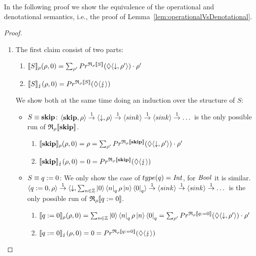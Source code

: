 \documentclass[a4paper,UKenglish,cleveref, autoref, thm-restate]{lipics-v2021}
\begin{document}
In the following proof we show the equivalence of the operational and denotational semantics, i.e., the proof of Lemma~\ref{lem:operationalVsDenotational}.
\begin{proof}
    \begin{enumerate}
        \item The first claim consist of two parts:
        \begin{enumerate}
            \item $\llbracket S \rrbracket_{\rho}(\rho,0) = \sum_{\rho'} Pr^{\mathfrak{R}_{\rho}\llbracket S \rrbracket}(\lozenge \langle \downarrow , \rho' \rangle) \cdot \rho'$
    \item $\llbracket S \rrbracket_{\lightning}(\rho,0) = Pr^{\mathfrak{R}_{\rho}\llbracket S \rrbracket}(\lozenge \langle \lightning \rangle) $
        \end{enumerate}

    We show both at the same time doing an induction over the structure of $S$:
    \begin{itemize}
        \item $S\equiv \mathbf{skip}$: $\langle \mathbf{skip} , \rho \rangle \overset{1}{\rightarrow} \langle \downarrow , \rho \rangle \overset{1}{\rightarrow} \langle sink \rangle \overset{1}{\rightarrow} \langle sink \rangle \overset{1}{\rightarrow}  \dots$ is the only possible run of $\mathfrak{R}_{\rho}\llbracket \mathbf{skip} \rrbracket$.
        \begin{enumerate}
            \item $\llbracket \mathbf{skip} \rrbracket_{\rho}(\rho,0) =  \rho = \sum_{\rho'} Pr^{\mathfrak{R}_{\rho}\llbracket \mathbf{skip} \rrbracket}(\lozenge \langle \downarrow , \rho' \rangle) \cdot \rho'$
        \item $\llbracket \mathbf{skip} \rrbracket_{\lightning}(\rho,0) = 0 =  Pr^{\mathfrak{R}_{\rho}\llbracket \mathbf{skip} \rrbracket}(\lozenge \langle \lightning \rangle)$
        \end{enumerate}

        \item $S \equiv q:=0$: We only show the case of $type(q) = \mathit{Int}$, for $\mathit{Bool}$ it is similar.\\
        $\langle q:=0 , \rho \rangle \overset{1}{\rightarrow} \langle \downarrow , \sum_{n\in \mathbb{Z}} \ket{0} \bra{n}_q \rho \ket{n} \bra{0}_q \rangle \overset{1}{\rightarrow} \langle sink \rangle \overset{1}{\rightarrow} \langle sink \rangle \overset{1}{\rightarrow}  \dots$ is the only possible run of $\mathfrak{R}_{\rho}\llbracket q:=0 \rrbracket$.
        \begin{enumerate}
            \item $\llbracket q:=0 \rrbracket_{\rho}(\rho,0) =  \sum_{n\in \mathbb{Z}} \ket{0} \bra{n}_q \rho \ket{n} \bra{0}_q = \sum_{\rho'} Pr^{\mathfrak{R}_{\rho}\llbracket q:=0 \rrbracket}(\lozenge \langle \downarrow , \rho' \rangle) \cdot \rho' $
            \item $\llbracket q:=0 \rrbracket_{\lightning}(\rho,0) = 0 =  Pr^{\mathfrak{R}_{\rho}\llbracket q:=0 \rrbracket}(\lozenge \langle \lightning \rangle)$
        \end{enumerate}


\end{itemize}
\end{enumerate}
\end{proof}
\end{document}
